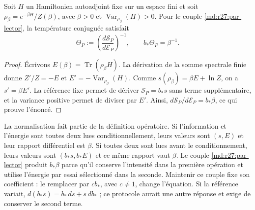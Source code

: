 \begin{theorem}
Soit $H$ un Hamiltonien autoadjoint fixe sur un espace fini et soit $\rho_\beta=e^{-\beta H}/Z(\beta)$, avec $\beta>0$ et $\operatorname{Var}_{\rho_\beta}(H)>0$. Pour le couple \eqref{md:r27:par-lector}, la température conjuguée satisfait
\begin{equation}
 \Theta_P:=\left(\frac{d\mathcal S_P}{d\mathcal E_P}\right)^{-1},
 \qquad b_*\Theta_P=\beta^{-1}.
 \label{md:r27:transductor}
\end{equation}
\end{theorem}
\begin{proof}
Écrivons $E(\beta)=\operatorname{Tr}(\rho_\beta H)$. La dérivation de la somme spectrale finie donne $Z'/Z=-E$ et $E'=-\operatorname{Var}_{\rho_\beta}(H)$. Comme $s(\rho_\beta)=\beta E+\ln Z$, on a $s'=\beta E'$. La référence fixe permet de dériver $\mathcal S_P=b_*s$ sans terme supplémentaire, et la variance positive permet de diviser par $E'$. Ainsi, $d\mathcal S_P/d\mathcal E_P=b_*\beta$, ce qui prouve l'énoncé.
\end{proof}

La normalisation fait partie de la définition opératoire. Si l'information et l'énergie sont toutes deux lues conditionnellement, leurs valeurs sont $(s,E)$ et leur rapport différentiel est $\beta$. Si toutes deux sont lues avant le conditionnement, leurs valeurs sont $(b_*s,b_*E)$ et ce même rapport vaut $\beta$. Le couple \eqref{md:r27:par-lector} produit $b_*\beta$ parce qu'il conserve l'intensité dans la première opération et utilise l'énergie par essai sélectionné dans la seconde. Maintenir ce couple fixe son coefficient : le remplacer par $cb_*$, avec $c\ne1$, change l'équation. Si la référence variait, $d(b_*s)=b_*\,ds+s\,db_*$ ; ce protocole aurait une autre réponse et exige de conserver le second terme.

